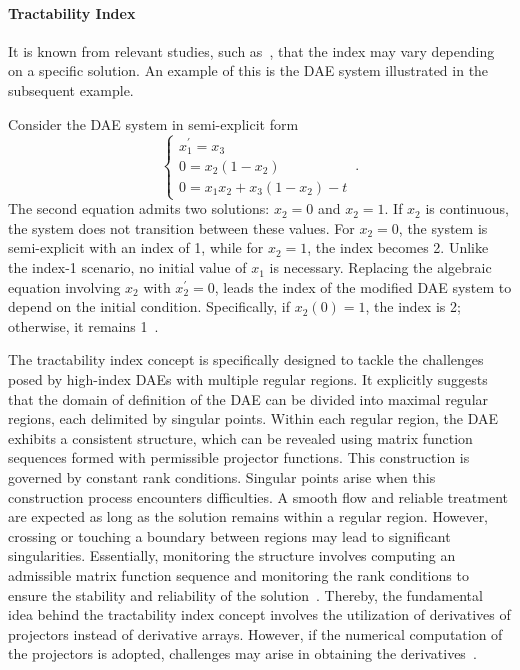 \paragraph{Tractability Index}

It is known from relevant studies, such as~\cite{lamour2013differential}, that the index may vary depending on a specific solution. An example of this is the \ac{DAE} system illustrated in the subsequent example.

\begin{example}
  Consider the \ac{DAE} system in semi-explicit form
  \begin{equation*}
    \begin{cases}
    x_1^{\prime} = x_3 \\
    0 = x_2(1 - x_2) \\
    0 = x_1x_2 + x_3(1 - x_2) - t
    \end{cases} \, \text{.}
  \end{equation*}
  The second equation admits two solutions: $x_2 = 0$ and $x_2 = 1$. If $x_2$ is continuous, the system does not transition between these values. For $x_2 = 0$, the system is semi-explicit with an index of 1, while for $x_2 = 1$, the index becomes 2. Unlike the index-1 scenario, no initial value of $x_1$ is necessary. Replacing the algebraic equation involving $x_2$ with $x_2^{\prime} = 0$, leads the index of the modified \ac{DAE} system to depend on the initial condition. Specifically, if $x_2(0) = 1$, the index is 2; otherwise, it remains 1~\cite[Section 3.3]{lamour2013differential}.
\end{example}

The tractability index concept is specifically designed to tackle the challenges posed by high-index \acp{DAE} with multiple regular regions. It explicitly suggests that the domain of definition of the \ac{DAE} can be divided into maximal regular regions, each delimited by singular points. Within each regular region, the \ac{DAE} exhibits a consistent structure, which can be revealed using matrix function sequences formed with permissible projector functions. This construction is governed by constant rank conditions. Singular points arise when this construction process encounters difficulties. A smooth flow and reliable treatment are expected as long as the solution remains within a regular region. However, crossing or touching a boundary between regions may lead to significant singularities. Essentially, monitoring the structure involves computing an admissible matrix function sequence and monitoring the rank conditions to ensure the stability and reliability of the solution~\cite{lamour2011computational}. Thereby, the fundamental idea behind the tractability index concept involves the utilization of derivatives of projectors instead of derivative arrays. However, if the numerical computation of the projectors is adopted, challenges may arise in obtaining the derivatives~\cite{mehrmann2015index}.

